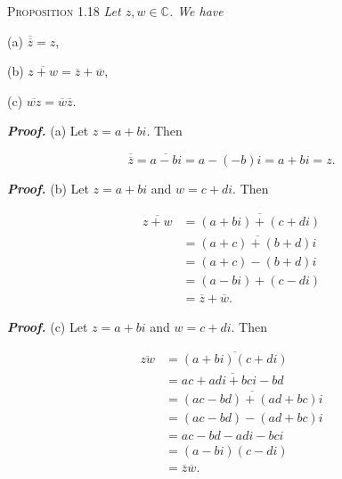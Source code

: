 \documentclass[12pt, a4paper]{article}
\begin{document}
\begin{description}
    \item\textsc{Proposition 1.18} \textit{Let $z,w\in\mathbb{C}$. We have}
    
    \begin{description}
        \item(a) $\overline{\overline{z}}=z$,
        \item(b) $\overline{z+w}=\overline{z}+\overline{w}$,
        \item(c) $\overline{wz}=\overline{w}\overline{z}$.
    \end{description}
    
    \vspace{4mm}
    
    \item\textit{\textbf{Proof.}} (a) Let $z=a+bi$. Then 
    
    \begin{equation*}
        \overline{\overline{z}} = \overline{a-bi} = a-(-b)i = a+bi = z.
    \end{equation*}
    
    \item\textit{\textbf{Proof.}} (b) Let $z=a+bi$ and $w=c+di$. Then
    
    \begin{equation*}
        \begin{split}
            \overline{z+w} &=\overline{(a+bi)+(c+di)} \\
            &=\overline{(a+c)+(b+d)i} \\
            &= (a+c)-(b+d)i \\
            &= (a-bi)+(c-di) \\
            &= \overline{z}+\overline{w}.
        \end{split}
    \end{equation*}
    
    \item\textit{\textbf{Proof.}} (c) Let $z=a+bi$ and $w=c+di$. Then
    
    \begin{equation*}
        \begin{split}
            \overline{zw} &= \overline{(a+bi)(c+di)} \\
            &= \overline{ac+adi+bci-bd} \\
            &= \overline{(ac-bd)+(ad+bc)i} \\
            &= (ac-bd)-(ad+bc)i \\
            &= ac-bd-adi-bci \\
            &= (a-bi)(c-di) \\
            &= \overline{z}\overline{w}.
        \end{split}
    \end{equation*}
    
\end{description}
\end{document}
